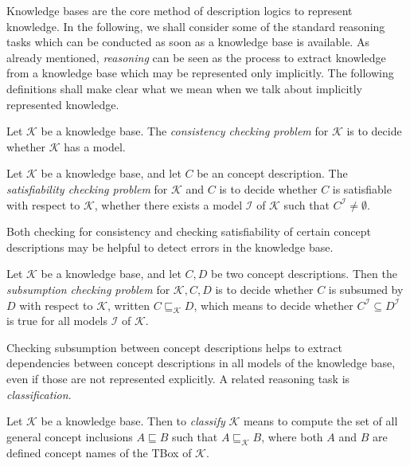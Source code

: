 Knowledge bases are the core method of description logics to represent knowledge.  In the
following, we shall consider some of the standard reasoning tasks which can be conducted
as soon as a knowledge base is available.  As already mentioned, \emph{reasoning} can be
seen as the process to extract knowledge from a knowledge base which may be represented
only implicitly.  The following definitions shall make clear what we mean when we talk
about implicitly represented knowledge.

\begin{Definition}
  \label{def:concistency-checking}
  Let $\mathcal{K}$ be a knowledge base.  The \emph{consistency checking problem} for
  $\mathcal{K}$ is to decide whether $\mathcal{K}$ has a model.
\end{Definition}

\begin{Definition}
  \label{def:satisfiability-checking}
  Let $\mathcal{K}$ be a knowledge base, and let $C$ be an concept description.  The
  \emph{satisfiability checking problem} for $\mathcal{K}$ and $C$ is to decide whether
  $C$ is satisfiable with respect to $\mathcal{K}$, \ie whether there exists a model
  $\mathcal{I}$ of $\mathcal{K}$ such that $C^{\mathcal{I}} \neq \emptyset$.
\end{Definition}

Both checking for consistency and checking satisfiability of certain concept descriptions
may be helpful to detect errors in the knowledge base.

\begin{Definition}
  \label{def:subsumption-checking}
  Let $\mathcal{K}$ be a knowledge base, and let $C, D$ be two concept descriptions.  Then
  the \emph{subsumption checking problem} for $\mathcal{K}, C, D$ is to decide whether $C$
  is subsumed by $D$ with respect to $\mathcal{K}$, written $C \sqsubseteq_{\mathcal{K}}
  D$, which means to decide whether $C^{\mathcal{I}} \subseteq D^{\mathcal{I}}$ is true
  for all models $\mathcal{I}$ of $\mathcal{K}$.
\end{Definition}

Checking subsumption between concept descriptions helps to extract dependencies between
concept descriptions in all models of the knowledge base, even if those are not
represented explicitly.  A related reasoning task is \emph{classification}.

\begin{Definition}[Classification]
  \label{def:classification}
  Let $\mathcal{K}$ be a knowledge base.  Then to \emph{classify} $\mathcal{K}$ means to
  compute the set of all general concept inclusions $A \sqsubseteq B$ such that $A
  \sqsubseteq_{\mathcal{K}} B$, where both $A$ and $B$ are defined concept names of the
  TBox of $\mathcal{K}$.
\end{Definition}

